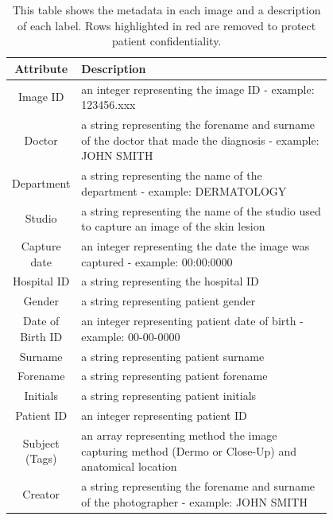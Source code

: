 \begin{table}
    \small
    \begin{tabular}{|c|p{0.8\linewidth}|}
    \hline
        Attribute & Description
        \\
        \hline
        Image ID & an integer representing the image ID - example: 123456.xxx
        \\
        \hline
        \rowcolor{Red}
        Doctor & a string representing the forename and surname of the doctor that made the diagnosis - example: JOHN SMITH
        \\
        \hline
        \rowcolor{Red}
        Department & a string representing the name of the department - example: DERMATOLOGY
        \\
        \hline
        \rowcolor{Red}
        Studio & a string representing the name of the studio used to capture an image of the skin lesion
        \\
        \hline
        Capture date & an integer representing the date the image was captured - example: 00:00:0000
        \\
        \hline
        \rowcolor{Red}
        Hospital ID & a string representing the hospital ID
        \\
        \hline
        Gender & a string representing patient gender
        \\
        \hline
        Date of Birth ID & an integer representing patient date of birth - example: 00-00-0000
        \\
        \hline
        \rowcolor{Red}
        Surname & a string representing patient surname
        \\
        \hline
        \rowcolor{Red}
        Forename & a string representing patient forename
        \\
        \hline
        \rowcolor{Red}
        Initials & a string representing patient initials
        \\
        \hline
        \rowcolor{Red}
        Patient ID & an integer representing patient ID
        \\
        \hline
        Subject (Tags) & an array representing method the image capturing method (Dermo or Close-Up) and anatomical location
        \\
        \hline
        \rowcolor{Red}
        Creator & a string representing the forename and surname of the photographer - example: JOHN SMITH
        \\
        \hline

    \end{tabular}
    \caption{This table shows the metadata in each image and a description of each label. Rows highlighted in red are removed to protect patient confidentiality.}
\end{table} \label{nhs-metadata}                         

